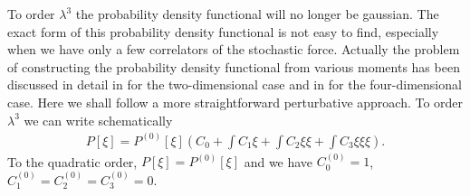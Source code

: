 \documentclass[%
amssymb,preprint,preprintnumbers,nofootinbib,superscriptaddress]{revtex4}
\begin{document}
To order $\lambda^{3}$ the probability density functional will no longer be gaussian. The exact form of this probability density functional is not easy to find, especially when we have only a few correlators of the stochastic force. Actually the problem of constructing the probability density functional from  various moments has been discussed in detail in \cite{FFR1} for the two-dimensional case and in \cite{FFR2} for the four-dimensional case. Here we shall follow a more straightforward perturbative approach. To order $\lambda^{3}$ we can write schematically
\begin{eqnarray}
P[\xi]=P^{(0)}[\xi]\left(C_{0}+\int C_{1}\xi+\int C_{2}\xi\xi+\int C_{3}\xi\xi\xi\right).
\end{eqnarray}
To the quadratic order, $P[\xi]=P^{(0)}[\xi]$ and we have $C_{0}^{(0)}=1$, $C_{1}^{(0)}=C_{2}^{(0)}=C_{3}^{(0)}=0$. 
\end{document}
